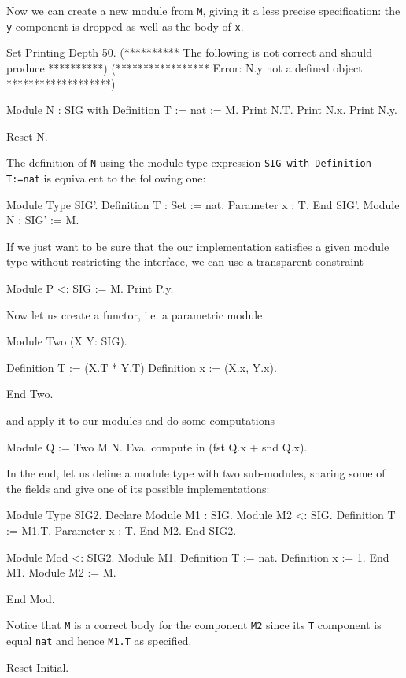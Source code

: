Now we can create a new module from \texttt{M}, giving it a less
precise specification: the \texttt{y} component is dropped as well
as the body of \texttt{x}.

\begin{coq_eval}
Set Printing Depth 50.
(********** The following is not correct and should produce **********)
(***************** Error: N.y not a defined object *******************)
\end{coq_eval}
\begin{coq_example}
Module N  :  SIG with Definition T := nat  :=  M.
Print N.T.
Print N.x.
Print N.y.
\end{coq_example}
\begin{coq_eval}
Reset N.
\end{coq_eval}

\noindent
The definition of \texttt{N} using the module type expression
\texttt{SIG with Definition T:=nat} is equivalent to the following
one:

\begin{coq_example*}
Module Type SIG'.
  Definition T : Set := nat.
  Parameter x : T.
End SIG'.
Module N : SIG' := M.
\end{coq_example*}
If we just want to be sure that the our implementation satisfies a
given module type without restricting the interface, we can use a
transparent constraint
\begin{coq_example}
Module P <: SIG := M.
Print P.y.
\end{coq_example}
Now let us create a functor, i.e. a parametric module
\begin{coq_example}
Module Two (X Y: SIG).
\end{coq_example}
\begin{coq_example*}
  Definition T := (X.T * Y.T)%
  Definition x := (X.x, Y.x).
\end{coq_example*}
\begin{coq_example}
End Two.
\end{coq_example}
and apply it to our modules and do some computations
\begin{coq_example}
Module Q := Two M N.
Eval compute in (fst Q.x + snd Q.x).
\end{coq_example}
In the end, let us define a module type with two sub-modules, sharing
some of the fields and give one of its possible implementations:
\begin{coq_example}
Module Type SIG2.
  Declare Module M1 : SIG.
  Module M2 <: SIG.
    Definition T := M1.T.
    Parameter x : T.
  End M2.
End SIG2.
\end{coq_example}
\begin{coq_example*}
Module Mod <: SIG2.
  Module M1.
    Definition T := nat.
    Definition x := 1.
  End M1.
  Module M2 := M.
\end{coq_example*}
\begin{coq_example}
End Mod.
\end{coq_example}
Notice that \texttt{M} is a correct body for the component \texttt{M2}
since its \texttt{T} component is equal \texttt{nat} and hence
\texttt{M1.T} as specified.
\begin{coq_eval}
Reset Initial.
\end{coq_eval}

